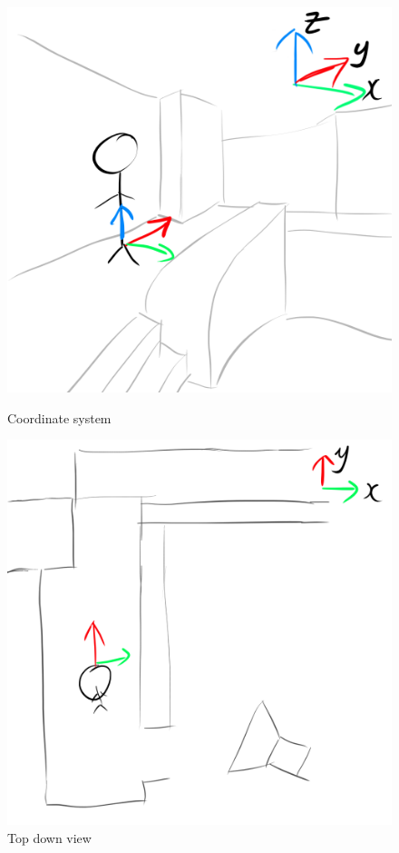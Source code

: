 \begin{figure}[H]
    \centering
    \begin{minipage}{.5\textwidth}
        \centering
        \includegraphics[width=0.9\linewidth]{assets/1coordinates.png}
        \caption{Coordinate system}
        \label{fig:1coordinates}
    \end{minipage}%
    \begin{minipage}{.5\textwidth}
        \centering
        \includegraphics[width=0.9\linewidth]{assets/2coordinate_topdown.png}
        \caption{Top down view}
        \label{fig:2coordinates_topdown}
    \end{minipage}
\end{figure}


